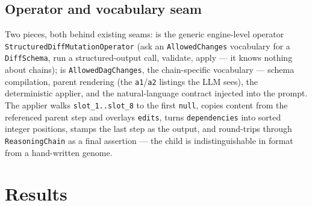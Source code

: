 \documentclass[11pt]{article}
\begin{document}
\subsection{Operator and vocabulary seam}
Two pieces, both behind existing seams:
 is the generic engine-level operator
\texttt{StructuredDiffMutationOperator} (ask an \texttt{AllowedChanges} vocabulary for a
\texttt{DiffSchema}, run a structured-output call, validate, apply --- it knows nothing about
chains);  is \texttt{AllowedDagChanges}, the chain-specific
vocabulary --- schema compilation, parent rendering (the \texttt{a1}/\texttt{a2} listings the
LLM sees), the deterministic applier, and the natural-language contract injected into the
prompt. The applier walks \texttt{slot\_1..slot\_8} to the first \texttt{null}, copies content
from the referenced parent step and overlays \texttt{edits}, turns \texttt{dependencies} into
sorted integer positions, stamps the last step as the output, and round-trips through
\texttt{ReasoningChain} as a final assertion --- the child is indistinguishable in format from
a hand-written genome.

\section{Results}
\label{sec:results}
\end{document}
